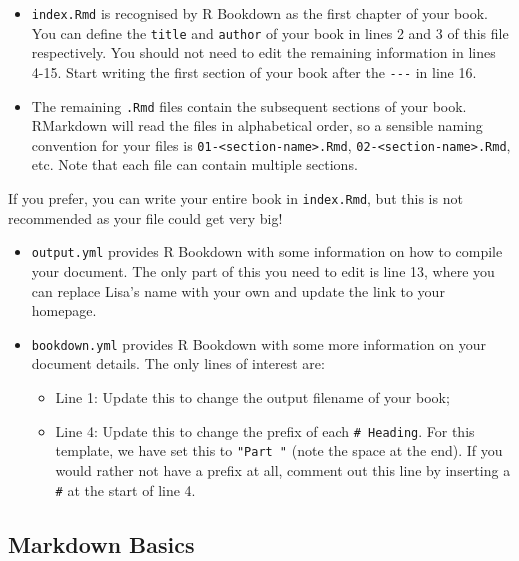 \documentclass[
  letterpaper,
]{article}
\providecommand{\tightlist}{%
  \setlength{\itemsep}{0pt}\setlength{\parskip}{0pt}}\usepackage{longtable,booktabs,array}
\numberwithin{equation}{section}
\numberwithin{figure}{section}
\theoremstyle{break}
\begin{document}
\begin{itemize}
\item
  \texttt{index.Rmd} is recognised by R Bookdown as the first chapter of
  your book. You can define the \texttt{title} and \texttt{author} of
  your book in lines 2 and 3 of this file respectively. You should not
  need to edit the remaining information in lines 4-15. Start writing
  the first section of your book after the \texttt{-\/-\/-} in line 16.
\item
  The remaining \texttt{.Rmd} files contain the subsequent sections of
  your book. RMarkdown will read the files in alphabetical order, so a
  sensible naming convention for your files is
  \texttt{01-\textless{}section-name\textgreater{}.Rmd},
  \texttt{02-\textless{}section-name\textgreater{}.Rmd}, etc. Note that
  each file can contain multiple sections.
\end{itemize}

If you prefer, you can write your entire book in \texttt{index.Rmd}, but
this is not recommended as your file could get very big!

\begin{itemize}
\item
  \texttt{output.yml} provides R Bookdown with some information on how
  to compile your document. The only part of this you need to edit is
  line 13, where you can replace Lisa's name with your own and update
  the link to your homepage.
\item
  \texttt{bookdown.yml} provides R Bookdown with some more information
  on your document details. The only lines of interest are:

  \begin{itemize}
  \tightlist
  \item
    Line 1: Update this to change the output filename of your book;
  \item
    Line 4: Update this to change the prefix of each
    \texttt{\#\ Heading}. For this template, we have set this to
    \texttt{"Part\ "} (note the space at the end). If you would rather
    not have a prefix at all, comment out this line by inserting a
    \texttt{\#} at the start of line 4.
  \end{itemize}
\end{itemize}

\subsection{Markdown Basics}\label{markdown-basics}
\end{document}
